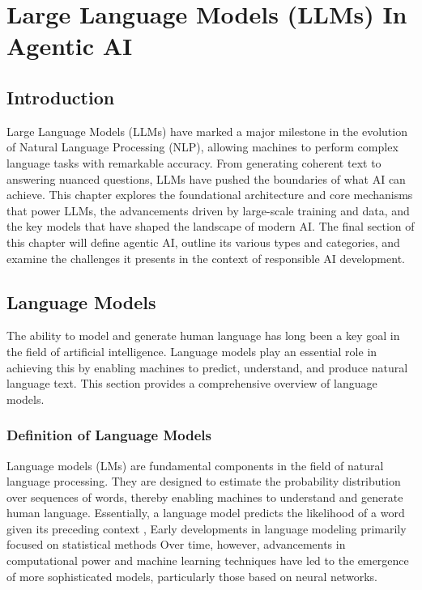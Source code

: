 \chapter{Large Language Models (LLMs) In Agentic AI
 }
\pagestyle{fancy}
\pagestyle{fancy}\chead{} \pagestyle{fancy}\rhead{} 

\section{Introduction} \label{start1}
Large Language Models (LLMs) have marked a major milestone in the evolution of Natural Language Processing (NLP), allowing machines to perform complex language tasks with remarkable accuracy. From generating coherent text to answering nuanced questions, LLMs have pushed the boundaries of what AI can achieve. This chapter explores the foundational architecture and core mechanisms that power LLMs, the advancements driven by large-scale training and data, and the key models that have shaped the landscape of modern AI. The final section of this chapter will define agentic AI, outline its various types and categories, and examine the challenges it presents in the context of responsible AI development.
\section{Language Models}
The ability to model and generate human language has long been a key goal in the field of artificial intelligence. Language models play an essential role in achieving this by enabling machines to predict, understand, and produce natural language text. This section provides a comprehensive overview of language models. 
\subsection{Definition of Language Models}
Language models (LMs) are fundamental components in the field of natural language processing. They are designed to estimate the probability distribution over sequences of words, thereby enabling machines to understand and generate human language. Essentially, a language model predicts the likelihood of a word given its preceding context \citep{BengioDVJ03}, Early developments in language modeling primarily focused on statistical methods Over time, however, advancements in computational power and machine learning techniques have led to the emergence of more sophisticated models, particularly those based on neural networks.
